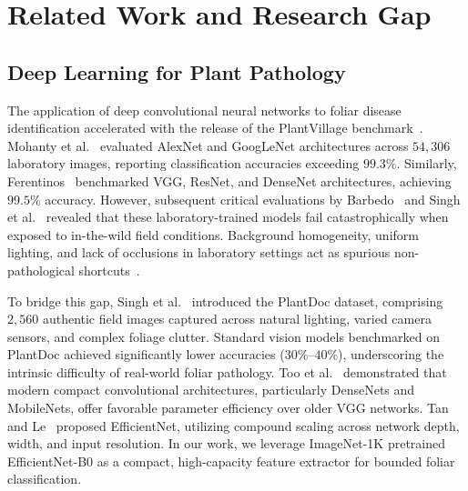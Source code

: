 \documentclass[conference]{IEEEtran}
\begin{document}
\section{Related Work and Research Gap}

\subsection{Deep Learning for Plant Pathology}
The application of deep convolutional neural networks to foliar disease identification accelerated with the release of the PlantVillage benchmark~\cite{hughes2015plantvillage}. Mohanty et al.~\cite{mohanty2016deep} evaluated AlexNet and GoogLeNet architectures across $54,306$ laboratory images, reporting classification accuracies exceeding $99.3\%$. Similarly, Ferentinos~\cite{ferentinos2018deep} benchmarked VGG, ResNet, and DenseNet architectures, achieving $99.5\%$ accuracy. However, subsequent critical evaluations by Barbedo~\cite{barbedo2018impact} and Singh et al.~\cite{singh2020plantdoc} revealed that these laboratory-trained models fail catastrophically when exposed to in-the-wild field conditions. Background homogeneity, uniform lighting, and lack of occlusions in laboratory settings act as spurious non-pathological shortcuts~\cite{geirhos2020shortcut}. 

To bridge this gap, Singh et al.~\cite{singh2020plantdoc} introduced the PlantDoc dataset, comprising $2,560$ authentic field images captured across natural lighting, varied camera sensors, and complex foliage clutter. Standard vision models benchmarked on PlantDoc achieved significantly lower accuracies ($30\%\text{--}40\%$), underscoring the intrinsic difficulty of real-world foliar pathology. Too et al.~\cite{too2019comparative} demonstrated that modern compact convolutional architectures, particularly DenseNets and MobileNets, offer favorable parameter efficiency over older VGG networks. Tan and Le~\cite{tan2019efficientnet} proposed EfficientNet, utilizing compound scaling across network depth, width, and input resolution. In our work, we leverage ImageNet-1K pretrained EfficientNet-B0 as a compact, high-capacity feature extractor for bounded foliar classification.
\end{document}
